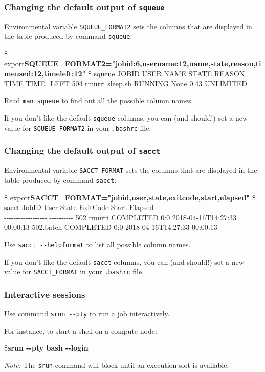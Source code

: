 \documentclass[english,serif,mathserif,usenames,dvipsnames]{beamer}
\begin{document}
\begin{frame}[fragile]
  \frametitle{Changing the default output of \texttt{squeue}}

  Environmental variable \texttt{SQUEUE\_FORMAT2} sets the columns that
  are displayed in the table produced by command \texttt{squeue}:

  \begin{semiverbatim}\tiny
\$ export{\bfseries SQUEUE_FORMAT2="jobid:6,username:12,name,state,reason,timeused:12,timeleft:12"}
\$ squeue
JOBID USER        NAME                STATE       REASON              TIME        TIME_LEFT
504   rmurri      sleep.sh            RUNNING     None                0:43        UNLIMITED
\end{semiverbatim}

  \+
  Read \texttt{man squeue} to find out all the possible column names.

  \+ If you don't like the default \texttt{squeue} columns, you can
  (and should!) set a new value for \texttt{SQUEUE\_FORMAT2} in your
  \texttt{.bashrc} file.
\end{frame}


\begin{frame}[fragile]
  \frametitle{Changing the default output of \texttt{sacct}}

  Environmental variable \texttt{SACCT\_FORMAT} sets the columns that
  are displayed in the table produced by command \texttt{sacct}:

  \begin{semiverbatim}\tiny
\$ export{\bfseries SACCT_FORMAT="jobid,user,state,exitcode,start,elapsed"}
\$ sacct
       JobID      User      State ExitCode               Start    Elapsed
-{}-{}-{}-{}-{}-{}-{}-{}-{}-{}-{}- -{}-{}-{}-{}-{}-{}-{}-{}- -{}-{}-{}-{}-{}-{}-{}-{}-{}- -{}-{}-{}-{}-{}-{}-{}- -{}-{}-{}-{}-{}-{}-{}-{}-{}-{}-{}-{}-{}-{}-{}-{}-{}-{}- -{}-{}-{}-{}-{}-{}-{}-{}-{}-
502             rmurri  COMPLETED      0:0 2018-04-16T14:27:33   00:00:13
502.batch               COMPLETED      0:0 2018-04-16T14:27:33   00:00:13
\end{semiverbatim}

  \+
  Use \texttt{sacct -{}-helpformat} to list all possible column names.

  \+ If you don't like the default \texttt{sacct} columns, you can
  (and should!) set a new value for \texttt{SACCT\_FORMAT} in your
  \texttt{.bashrc} file.
\end{frame}


\begin{frame}[fragile]
  \frametitle{Interactive sessions}

  Use command \texttt{srun -{}-pty} to run a job interactively.

  \+
  For instance, to start a shell on a compute node:
\begin{semiverbatim}
\${\bfseries srun -{}-pty bash -{}-login}
\end{semiverbatim}

  \+ \emph{Note:} The \texttt{srun} command will block until an
  execution slot is available.
\end{frame}
\end{document}
